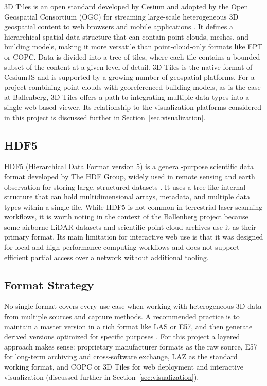 \documentclass[]{report}
\begin{document}
3D Tiles is an open standard developed by Cesium and adopted by the Open Geospatial
Consortium (OGC) for streaming large-scale heterogeneous 3D geospatial content to web
browsers and mobile applications \cite{ogc_3dtiles}. It defines a hierarchical spatial data
structure that can contain point clouds, meshes, and building models, making it more versatile
than point-cloud-only formats like EPT or COPC. Data is divided into a tree of tiles, where
each tile contains a bounded subset of the content at a given level of detail. 3D Tiles is the
native format of CesiumJS and is supported by a growing number of geospatial platforms. For
a project combining point clouds with georeferenced building models, as is the case at
Ballenberg, 3D Tiles offers a path to integrating multiple data types into a single web-based
viewer. Its relationship to the visualization platforms considered in this project is discussed
further in Section~\ref{sec:visualization}.

\subsection{HDF5}

HDF5 (Hierarchical Data Format version 5) is a general-purpose scientific data format
developed by The HDF Group, widely used in remote sensing and earth observation for storing
large, structured datasets \cite{esco2022review}. It uses a tree-like internal structure that can
hold multidimensional arrays, metadata, and multiple data types within a single file. While HDF5
is not common in terrestrial laser scanning workflows, it is worth noting in the context of the
Ballenberg project because some airborne LiDAR datasets and scientific point cloud archives use
it as their primary format. Its main limitation for interactive web use is that it was designed for
local and high-performance computing workflows and does not support efficient partial access
over a network without additional tooling.

\subsection{Format Strategy}

No single format covers every use case when working with heterogeneous 3D data from multiple
sources and capture methods. A recommended practice is to maintain a master version in a rich
format like LAS or E57, and then generate derived versions optimized for specific purposes
\cite{cadinterop_las}. For this project a layered approach makes sense: proprietary manufacturer
formats as the raw source, E57 for long-term archiving and cross-software exchange, LAZ as the
standard working format, and COPC or 3D Tiles for web deployment and interactive visualization
(discussed further in Section~\ref{sec:visualization}).
\end{document}
